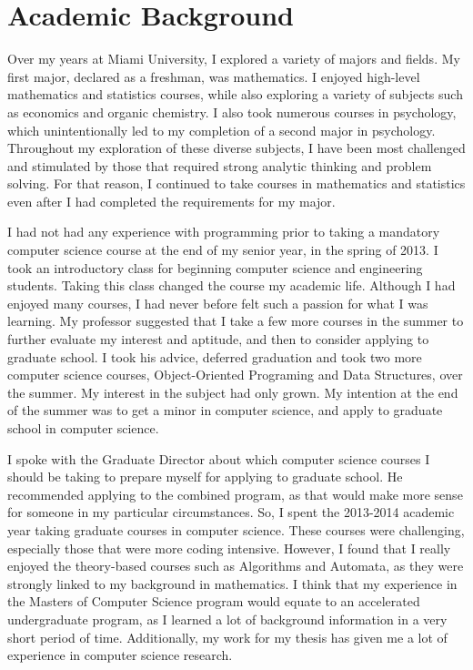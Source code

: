 \section{Academic Background}
Over my years at Miami University, I explored a variety of majors and fields. My first major, declared as a freshman, was mathematics. I enjoyed high-level mathematics and statistics courses, while also exploring a variety of subjects such as economics and organic chemistry. I also took numerous courses in psychology, which unintentionally led to my completion of a second major in psychology. Throughout my exploration of these diverse subjects, I have been most challenged and stimulated by those that required strong analytic thinking and problem solving. For that reason, I continued to take courses in mathematics and statistics even after I had completed the requirements for my major.

I had not had any experience with programming prior to taking a mandatory computer science course at the end of my senior year, in the spring of 2013. I took an introductory class for beginning computer science and engineering students. Taking this class changed the course my academic life. Although I had enjoyed many courses, I had never before felt such a passion for what I was learning. My professor suggested that I take a few more courses in the summer to further evaluate my interest and aptitude, and then to consider applying to graduate school. I took his advice, deferred graduation and took two more computer science courses, Object-Oriented Programing and Data Structures, over the summer.  My interest in the subject had only grown. My intention at the end of the summer was to get a minor in computer science, and apply to graduate school in computer science. 

I spoke with the Graduate Director about  which computer science courses I should be taking to prepare myself for applying to graduate school. He recommended applying to the combined program, as that would make more sense for someone in my particular circumstances. So, I spent the 2013-2014 academic year taking graduate courses in computer science. These courses were challenging, especially those that were more coding intensive. However, I found that I really enjoyed the theory-based courses such as Algorithms and Automata, as they were strongly linked to my background in mathematics. I think that my experience in the Masters of Computer Science program would equate to an accelerated undergraduate program, as I learned a lot of background information in a very short period of time. Additionally, my work for my thesis has given me a lot of experience in computer science research.